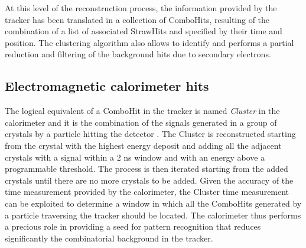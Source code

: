 \documentclass[12pt,a4paper,openright, oneside, titlepage]{book} %
\begin{document}
At this level of the reconstruction process, the information provided by the tracker has been translated in a collection of ComboHits, resulting of the combination of a list of associated StrawHits and specified by their time and position.
The clustering algorithm also allows to identify and  performs a partial reduction and filtering of the background hits due to secondary electrons.

\subsection{Electromagnetic calorimeter hits} 
The logical equivalent of a ComboHit in the tracker is named \textit{Cluster} in the calorimeter and it is the combination of the signals generated in a group of crystals by a particle hitting the detector \cite{CalCluster_2} \cite{CalCluster}. 
The Cluster is reconstructed starting from the crystal with the highest energy deposit and adding all the adjacent crystals with a signal within a 2 ns window and with an energy above a programmable threshold. 
The process is then iterated starting from the added crystals until there are no more crystals to be added.
Given the accuracy of the time measurement provided by the calorimeter, the Cluster time measurement can be exploited to determine a window in which all the ComboHits generated by a particle traversing the tracker should be located.
The calorimeter thus performs a precious role in providing a seed for pattern recognition that reduces significantly the combinatorial background in the tracker.
\end{document}
